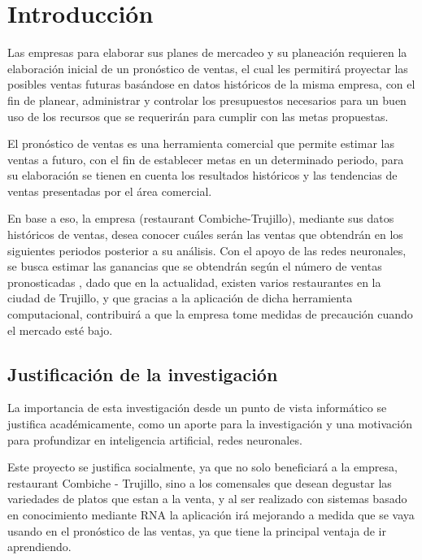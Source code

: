 \chapter{Introducción}
\setcounter{page}{1}

Las empresas para elaborar sus planes de mercadeo y su planeación requieren la elaboración inicial de un pronóstico de ventas, el cual les permitirá proyectar las posibles ventas futuras basándose
en datos históricos de la misma empresa, con el fin de planear, administrar y controlar los presupuestos necesarios para un buen uso de los recursos que se requerirán para cumplir con las metas propuestas.

El pronóstico de ventas es una herramienta comercial que permite estimar las ventas a futuro, con el fin de establecer metas en un determinado periodo, para su elaboración se tienen en cuenta los resultados históricos y las tendencias de ventas presentadas por el área comercial.

En base a eso, la empresa (restaurant Combiche-Trujillo), mediante sus datos históricos de ventas, desea conocer cuáles serán las ventas que obtendrán en los siguientes periodos posterior a su
análisis. Con el apoyo de las redes neuronales, se busca estimar las ganancias que se obtendrán según el número de ventas pronosticadas , dado que en la actualidad, existen varios restaurantes en la ciudad de Trujillo, y que gracias a la aplicación de dicha herramienta computacional, contribuirá a que la empresa tome medidas de precaución cuando el mercado esté bajo.

\section{Justificación de la investigación}
La importancia de esta investigación desde un punto de vista informático se justifica académicamente, como un aporte para la investigación y una motivación para profundizar en inteligencia artificial, redes neuronales.

Este proyecto se justifica socialmente, ya que no solo beneficiará a la empresa, restaurant Combiche - Trujillo, sino a los comensales que desean degustar las variedades de platos que estan a la venta, y al ser realizado con sistemas basado en conocimiento mediante RNA la aplicación irá mejorando a medida que se vaya usando en el pronóstico de las ventas, ya que tiene la principal ventaja de ir aprendiendo.

